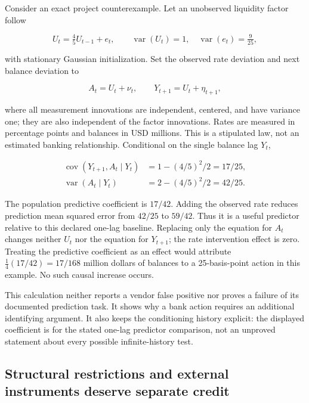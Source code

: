 Consider an exact project counterexample. Let an unobserved liquidity
factor follow

\[
 U_t=\tfrac45U_{t-1}+e_t,\qquad
 \operatorname{var}(U_t)=1,\quad \operatorname{var}(e_t)=\tfrac9{25},
\]

with stationary Gaussian initialization. Set the observed rate deviation
and next balance deviation to

\[
 A_t=U_t+\nu_t,\qquad Y_{t+1}=U_t+\eta_{t+1},
\]

where all measurement innovations are independent, centered, and have
variance one; they are also independent of the factor innovations. Rates
are measured in percentage points and balances in USD millions. This is
a stipulated law, not an estimated banking relationship. Conditional on
the single balance lag \(Y_t\),

\[
 \begin{aligned}
 \operatorname{cov}(Y_{t+1},A_t\mid Y_t)&=1-(4/5)^2/2=17/25,\\
 \operatorname{var}(A_t\mid Y_t)&=2-(4/5)^2/2=42/25.
 \end{aligned}
\]

The population predictive coefficient is \(17/42\). Adding the observed
rate reduces prediction mean squared error from \(42/25\) to \(59/42\).
Thus it is a useful predictor relative to this declared one-lag
baseline. Replacing only the equation for \(A_t\) changes neither
\(U_t\) nor the equation for \(Y_{t+1}\); the rate intervention effect
is zero. Treating the predictive coefficient as an effect would
attribute \(\tfrac14(17/42)=17/168\) million dollars of balances to a
25-basis-point action in this example. No such causal increase occurs.
\citep{exec13_ct_examples}

This calculation neither reports a vendor false positive nor proves a
failure of its documented prediction task. It shows why a bank action
requires an additional identifying argument. It also keeps the
conditioning history explicit: the displayed coefficient is for the
stated one-lag predictor comparison, not an unproved statement about
every possible infinite-history test.

\hypertarget{structural-restrictions-and-external-instruments-deserve-separate-credit}{%
\subsection{Structural restrictions and external instruments deserve
separate
credit}\label{structural-restrictions-and-external-instruments-deserve-separate-credit}}

